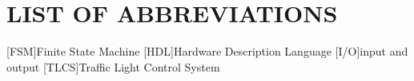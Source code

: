 \documentclass[12pt,a4paper]{article}
\begin{document}
\section*{LIST OF ABBREVIATIONS}
\begin{acronym}[TLCS]\itemsep0pt
	[FSM]{Finite State Machine}
	[HDL]{Hardware Description Language}
	[I/O]{input and output}
	[TLCS]{Traffic Light Control System}
\end{acronym}

\clearpage
\fancyhead[L]{\footnotesize\textsl{\nouppercase\leftmark}}
\titleformat{\section}{\normalfont\Large\bfseries}{\thesection}{1em}{}
\onehalfspacing{}
\clearpage

\clearpage

\clearpage

\clearpage

\clearpage

\clearpage

\clearpage


\clearpage
{}
\fancyhead{}
\fancyhead[L]{\footnotesize\textsl{\nouppercase\rightmark}}

\clearpage
\fancyhead{}
\fancyhead[L]{\footnotesize\textsl{\nouppercase\leftmark}}
\begin{flushleft}
	\singlespacing{}
	\setlength{\bibitemsep}{\baselineskip}
	\titleformat{\section}{\normalfont\Large\bfseries\centering}{\thesection}{1em}{}
	\renewcommand{\refname}{REFERENCES}
	\printbibliography{}
\end{flushleft}
\end{document}

